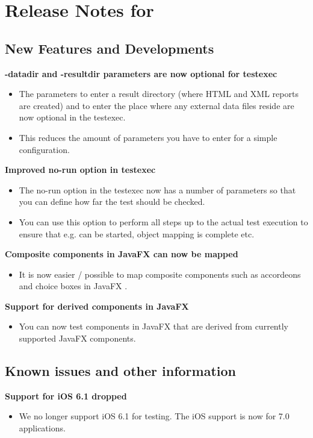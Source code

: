 \makeatletter
\section{Release Notes for \@bxversion}
\makeatother

\subsection{New Features and Developments}
\textbf{-datadir and -resultdir parameters are now optional for testexec}
\begin{itemize}
\item The parameters to enter a result directory (where HTML and XML reports are created) and to enter the place where any external data files reside are now optional in the testexec.
\item This reduces the amount of parameters you have to enter for a simple configuration.
\end{itemize}

\textbf{Improved no-run option in testexec}
\begin{itemize}
\item The no-run option in the testexec now has a number of parameters so that you can define how far the test should be checked. 
\item You can use this option to perform all steps up to the actual test execution to ensure that e.g. \gdauts{} can be started, object mapping is complete etc.
\end{itemize}

\textbf{Composite components in JavaFX can now be mapped}
\begin{itemize}
\item It is now easier / possible to map composite components such as accordeons and choice boxes in JavaFX \gdauts{}. 
\end{itemize}

\textbf{Support for derived components in JavaFX}
\begin{itemize}
\item You can now test components in JavaFX \gdauts{} that are derived from currently supported JavaFX components. 
\end{itemize}

\subsection{Known issues and other information}
\textbf{Support for iOS 6.1 dropped}
\begin{itemize}
\item We no longer support iOS 6.1 for testing. The iOS support is now for 7.0 applications. 
\end{itemize}
